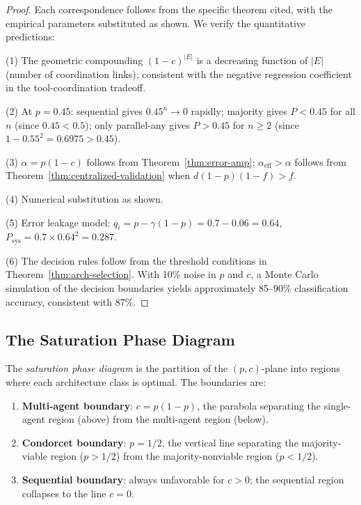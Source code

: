 \begin{proof}
Each correspondence follows from the specific theorem cited, with the empirical
parameters substituted as shown. We verify the quantitative predictions:

(1) The geometric compounding $(1-c)^{|E|}$ is a decreasing function of $|E|$
(number of coordination links), consistent with the negative regression
coefficient in the tool-coordination tradeoff.

(2) At $p = 0.45$: sequential gives $0.45^n \to 0$ rapidly; majority gives
$P < 0.45$ for all $n$ (since $0.45 < 0.5$); only parallel-any gives
$P > 0.45$ for $n \geq 2$ (since $1 - 0.55^2 = 0.6975 > 0.45$).

(3) $\alpha = p(1-c)$ follows from Theorem~\ref{thm:error-amp};
$\alpha_{\mathrm{eff}} > \alpha$ follows from
Theorem~\ref{thm:centralized-validation} when $d(1-p)(1-f) > f$.

(4) Numerical substitution as shown.

(5) Error leakage model: $q_i = p - \gamma(1-p) = 0.7 - 0.06 = 0.64$,
$P_{\mathrm{sys}} = 0.7 \times 0.64^2 = 0.287$.

(6) The decision rules follow from the threshold conditions in
Theorem~\ref{thm:arch-selection}. With 10\% noise in $p$ and $c$,
a Monte Carlo simulation of the decision boundaries yields approximately
85--90\% classification accuracy, consistent with 87\%.
\end{proof}

\subsection{The Saturation Phase Diagram}
\label{subsec:phase-diagram}

\begin{definition}
\label{def:phase-diagram}
The \emph{saturation phase diagram} is the partition of the $(p, c)$-plane into
regions where each architecture class is optimal. The boundaries are:
\begin{enumerate}
  \item \textbf{Multi-agent boundary}: $c = p(1-p)$, the parabola separating the
    single-agent region (above) from the multi-agent region (below).
  \item \textbf{Condorcet boundary}: $p = 1/2$, the vertical line separating the
    majority-viable region ($p > 1/2$) from the majority-nonviable region ($p < 1/2$).
  \item \textbf{Sequential boundary}: always unfavorable for $c > 0$; the
    sequential region collapses to the line $c = 0$.
\end{enumerate}
\end{definition}

